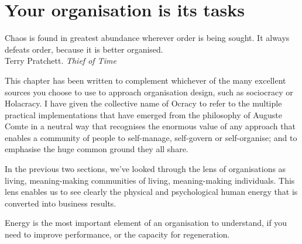 \chapter{Your organisation is its tasks}
\label{chapter:who-is-your-organisation-tasks}


\begin{chapterquotation}
Chaos is found in greatest abundance wherever order is being sought. It always defeats order, because it is better organised.\\
\raggedleft\textemdash Terry Pratchett. \emph{Thief of Time}
\end{chapterquotation}


\label{section:task-role-arena}


This chapter has been written to complement whichever of the many excellent sources you choose to use to approach organisation design, such as sociocracy or Holacracy. I have given the collective name of Ocracy to refer to the multiple practical implementations that have emerged from the philosophy of Auguste Comte in a neutral way that recognises the enormous value of any approach that enables a community of people to self-manage, self-govern or self-organise; and to emphasise the huge common ground they all share.  


In the previous two sections, we've looked through the lens of organisations as living, meaning\hyp{}making communities of living, meaning\hyp{}making individuals. This lens enables us to see clearly the physical and psychological human energy that is converted into business results. 


Energy is the most important element of an organisation to understand, if you need to improve performance, or the capacity for regeneration. 


